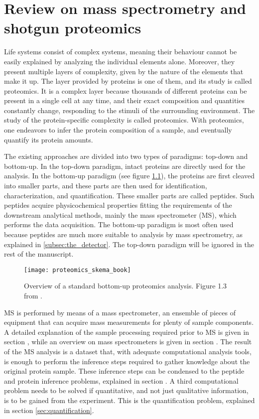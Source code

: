 \chapter{Review on mass spectrometry and shotgun proteomics}
\label{chap:mass_spec}

Life systems consist of complex systems, meaning their behaviour cannot be easily explained by analyzing the individual elements alone. Moreover, they present multiple layers of complexity, given by the nature of the elements that make it up. The layer provided by proteins is one of them, and its study is called proteomics. It is a complex layer because thousands of different proteins can be present in a single cell at any time, and their exact composition and quantities constantly change, responding to the stimuli of the surrounding environment. The study of the protein-specific complexity is called proteomics. With proteomics, one endeavors to infer the protein composition of a sample, and eventually quantify its protein amounts.

The existing approaches are divided into two types of paradigms: top-down and bottom-up. In the top-down paradigm, intact proteins are directly used for the analysis. In the bottom-up paradigm (see figure \ref{fig:proteomics_overview}), the proteins are first cleaved into smaller parts, and these parts are then used for identification, characterization, and quantification. These smaller parts are called peptides. \cite{Barsnes2008}  Such peptides acquire physicochemical properties fitting the requirements of the downstream analytical methods, mainly the mass spectrometer (MS), which performs the data acquisition. The bottom-up paradigm is most often used because peptides are much more suitable to analysis by mass spectrometry, as explained in \ref{subsec:the_detector}. The top-down paradigm will be ignored in the rest of the manuscript.

\begin{figure}[!h]
\texttt{[image: proteomics\_skema\_book]}
\caption{Overview of a standard bottom-up proteomics analysis. Figure 1.3 from \cite{Barsnes2008}.}
\label{fig:proteomics_overview}
\end{figure}

MS is performed by means of a mass spectrometer, an ensemble of pieces of equipment that can acquire mass measurements for plenty of sample components. A detailed explanation of the sample processing required prior to MS is given in section \label{sec:sample processing}, while an overview on mass spectrometers is given in section \label{sec:the mass spectrometer}. The result of the MS analysis is a dataset that, with adequate computational analysis tools, is enough to perform the inference steps required to gather knowledge about the original protein sample. These inference steps can be condensed to the peptide and protein inference problems, explained in section \label{sec:peptide and protein inference}. A third computational problem needs to be solved if quantitative, and not just qualitative information, is to be gained from the experiment. This is the quantification problem, explained in section \ref{sec:quantification}.

